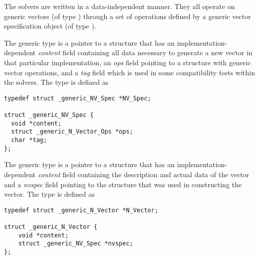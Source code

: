 %
The {\sundials} solvers are written in a data-independent manner. 
They all operate on generic vectors (of type ) through a set of
operations defined by a generic vector specification object (of type ).

The generic  type is a pointer to a structure that has an
implementation-dependent {\em content} field containing
all data necessary to generate a new vector in that particular
implementation, an {\em ops} field pointing to a structure with
generic vector operations, and a {\em tag} field which is used
in some compatibility tests within the {\sundials} solvers. 
The type  is defined as
\begin{verbatim}
typedef struct _generic_NV_Spec *NV_Spec;

struct _generic_NV_Spec {
  void *content;
  struct _generic_N_Vector_Ops *ops;
  char *tag;
};
\end{verbatim}

The generic  type is a pointer to a structure that has an 
implementation-dependent {\em content} field containing the 
description and actual data of the vector and a {\em nvspec} field 
pointing to the  structure that was used in constructing the
vector.
The type  is defined as
\begin{verbatim}
typedef struct _generic_N_Vector *N_Vector;

struct _generic_N_Vector {
    void *content;
    struct _generic_NV_Spec *nvspec;
};
\end{verbatim}

